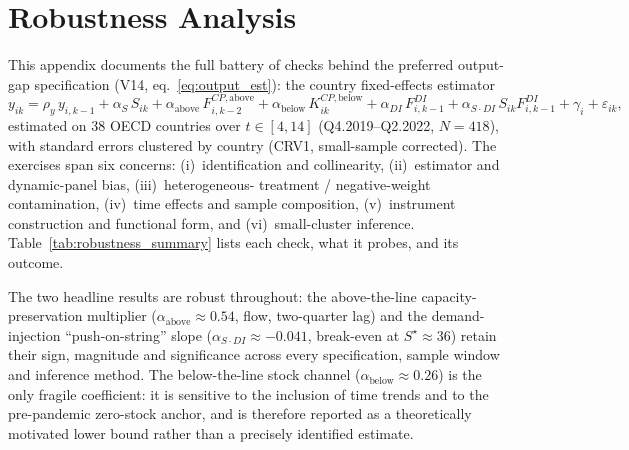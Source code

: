 \section{Robustness Analysis}\label{app:robustness}

This appendix documents the full battery of checks behind the preferred
output-gap specification (V14, eq.~\ref{eq:output_est}): the country
fixed-effects estimator
\[
y_{ik}=\rho_y\,y_{i,k-1}+\alpha_S\,S_{ik}
       +\alpha_{\text{above}}\,F^{CP,\text{above}}_{i,k-2}
       +\alpha_{\text{below}}\,K^{CP,\text{below}}_{ik}
       +\alpha_{DI}\,F^{DI}_{i,k-1}
       +\alpha_{S\cdot DI}\,S_{ik}F^{DI}_{i,k-1}
       +\gamma_i+\varepsilon_{ik},
\]
estimated on 38 OECD countries over $t\in[4,14]$ (Q4.2019--Q2.2022,
$N=418$), with standard errors clustered by country (CRV1, small-sample
corrected). The exercises span six concerns: (i)~identification and
collinearity, (ii)~estimator and dynamic-panel bias, (iii)~heterogeneous-
treatment / negative-weight contamination, (iv)~time effects and sample
composition, (v)~instrument construction and functional form, and
(vi)~small-cluster inference. Table~\ref{tab:robustness_summary} lists each
check, what it probes, and its outcome.

The two headline results are robust throughout: the above-the-line
capacity-preservation multiplier ($\alpha_{\text{above}}\approx0.54$, flow,
two-quarter lag) and the demand-injection ``push-on-string'' slope
($\alpha_{S\cdot DI}\approx-0.041$, break-even at $S^\star\approx36$) retain
their sign, magnitude and significance across every specification, sample
window and inference method. The below-the-line stock channel
($\alpha_{\text{below}}\approx0.26$) is the only fragile coefficient: it is
sensitive to the inclusion of time trends and to the pre-pandemic
zero-stock anchor, and is therefore reported as a theoretically motivated
lower bound rather than a precisely identified estimate.


